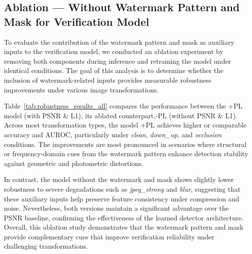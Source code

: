 \subsection{Ablation — Without Watermark Pattern and Mask for Verification Model}

To evaluate the contribution of the watermark pattern and mask as auxiliary inputs to the verification model, 
we conducted an ablation experiment by removing both components during inference and retraining the model 
under identical conditions. The goal of this analysis is to determine whether the inclusion of watermark-related inputs provides measurable robustness improvements under various image transformations.

Table~\ref{tab:robustness_results_all} compares the performance between the +PL model (with PSNR \& L1), its ablated counterpart,-PL (without PSNR \& L1). 
Across most transformation types, the model +PL achieves higher or comparable accuracy 
and AUROC, particularly under \textit{clean}, \textit{down\_up}, and \textit{occlusion} conditions. The improvements are most pronounced in scenarios where structural or frequency-domain cues from the watermark pattern enhance detection stability against geometric and photometric distortions.

In contrast, the model without the watermark and mask shows slightly lower robustness to severe degradations such as \textit{jpeg\_strong} and \textit{blur}, suggesting that these auxiliary inputs help preserve feature consistency under compression and noise. Nevertheless, both versions maintain a significant advantage over the PSNR baseline, confirming the effectiveness of the learned detector architecture. 
Overall, this ablation study demonstrates that the watermark pattern and mask provide complementary cues that improve verification reliability under challenging transformations.
